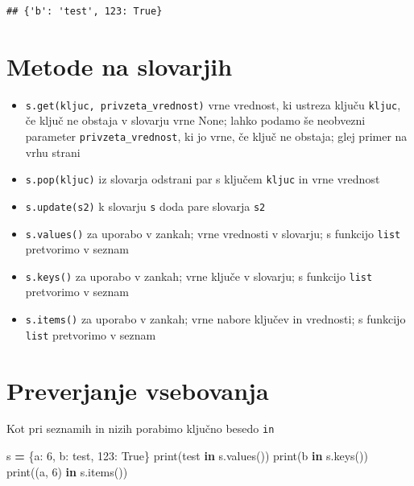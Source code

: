 \documentclass[
]{book}
\newenvironment{Shaded}{\begin{snugshade}}{\end{snugshade}}
\newcommand{\BuiltInTok}[1]{#1}
\newcommand{\DecValTok}[1]{\textcolor[rgb]{0.00,0.00,0.81}{#1}}
\newcommand{\KeywordTok}[1]{\textcolor[rgb]{0.13,0.29,0.53}{\textbf{#1}}}
\newcommand{\NormalTok}[1]{#1}
\newcommand{\OperatorTok}[1]{\textcolor[rgb]{0.81,0.36,0.00}{\textbf{#1}}}
\newcommand{\StringTok}[1]{\textcolor[rgb]{0.31,0.60,0.02}{#1}}
\newcommand{\VariableTok}[1]{\textcolor[rgb]{0.00,0.00,0.00}{#1}}
\providecommand{\tightlist}{%
  \setlength{\itemsep}{0pt}\setlength{\parskip}{0pt}}
\begin{document}
\begin{verbatim}
## {'b': 'test', 123: True}
\end{verbatim}

\hypertarget{metode-na-slovarjih}{%
\section{Metode na slovarjih}\label{metode-na-slovarjih}}

\begin{itemize}
\tightlist
\item
  \texttt{s.get(kljuc,\ privzeta\_vrednost)} vrne vrednost, ki ustreza ključu \texttt{kljuc}, če ključ ne obstaja v slovarju vrne None; lahko podamo še neobvezni parameter \texttt{privzeta\_vrednost}, ki jo vrne, če ključ ne obstaja; glej primer na vrhu strani
\item
  \texttt{s.pop(kljuc)} iz slovarja odstrani par s ključem \texttt{kljuc} in vrne vrednost
\item
  \texttt{s.update(s2)} k slovarju \texttt{s} doda pare slovarja \texttt{s2}
\item
  \texttt{s.values()} za uporabo v zankah; vrne vrednosti v slovarju; s funkcijo \texttt{list} pretvorimo v seznam
\item
  \texttt{s.keys()} za uporabo v zankah; vrne ključe v slovarju; s funkcijo \texttt{list} pretvorimo v seznam
\item
  \texttt{s.items()} za uporabo v zankah; vrne nabore ključev in vrednosti; s funkcijo \texttt{list} pretvorimo v seznam
\end{itemize}

\hypertarget{preverjanje-vsebovanja}{%
\section{Preverjanje vsebovanja}\label{preverjanje-vsebovanja}}

Kot pri seznamih in nizih porabimo ključno besedo \texttt{in}

\begin{Shaded}
\begin{Highlighting}[]
\NormalTok{s }\OperatorTok{=}\NormalTok{ \{}\StringTok{\textquotesingle{}a\textquotesingle{}}\NormalTok{: }\DecValTok{6}\NormalTok{, }\StringTok{\textquotesingle{}b\textquotesingle{}}\NormalTok{: }\StringTok{\textquotesingle{}test\textquotesingle{}}\NormalTok{, }\DecValTok{123}\NormalTok{: }\VariableTok{True}\NormalTok{\}}
\BuiltInTok{print}\NormalTok{(}\StringTok{\textquotesingle{}test\textquotesingle{}} \KeywordTok{in}\NormalTok{ s.values())}
\BuiltInTok{print}\NormalTok{(}\StringTok{\textquotesingle{}b\textquotesingle{}} \KeywordTok{in}\NormalTok{ s.keys())}
\BuiltInTok{print}\NormalTok{((}\StringTok{\textquotesingle{}a\textquotesingle{}}\NormalTok{, }\DecValTok{6}\NormalTok{) }\KeywordTok{in}\NormalTok{ s.items())}
\end{Highlighting}
\end{Shaded}
\end{document}
